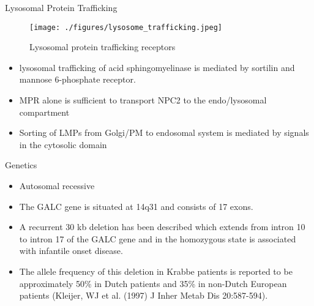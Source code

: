 \documentclass[presentation, smaller]{beamer}
\begin{document}
\begin{frame}[label={sec:orgb37bbae}]{Lysosomal Protein Trafficking}
\begin{figure}[htbp]
\centering
\texttt{[image: ./figures/lysosome\_trafficking.jpeg]}
\caption[traf]{\label{fig:orgc530686}
Lysosomal protein trafficking receptors}
\end{figure}

\footnotesize
\begin{itemize}
\item lysosomal trafficking of acid sphingomyelinase is mediated by sortilin and mannose 6-phosphate receptor.
\item MPR alone is sufficient to transport NPC2 to the endo/lysosomal compartment
\item Sorting of LMPs from Golgi/PM to endosomal system is mediated by
signals in the cytosolic domain
\end{itemize}
\end{frame}

\begin{frame}[label={sec:orge7a19b6}]{Genetics}
\begin{itemize}
\item Autosomal recessive
\item The GALC gene is situated at 14q31 and consists of 17 exons.
\item A recurrent 30 kb deletion has been described which extends from intron 10 to intron 17 of the GALC gene and in the homozygous state is associated with infantile onset disease.
\item The allele frequency of this deletion in Krabbe patients is reported to be approximately 50\% in Dutch patients and 35\% in non-Dutch European patients (Kleijer, WJ et al. (1997) J Inher Metab Dis 20:587-594).
\end{itemize}
\end{frame}
\end{document}

